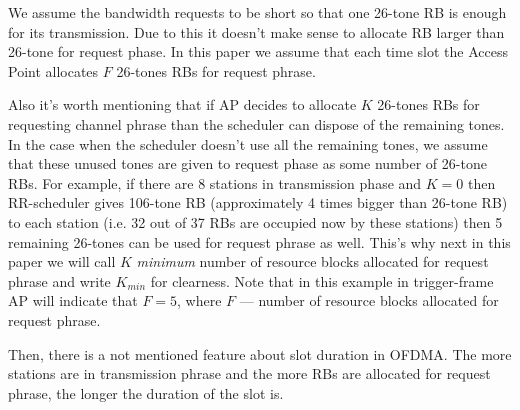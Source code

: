 We assume the bandwidth requests to be short so that one 26-tone RB is enough for its transmission. Due to this it doesn't make sense to allocate RB larger than 26-tone for request phase. In this paper we assume that each time slot the Access Point allocates $F$ 26-tones RBs for request phrase.

Also it's worth mentioning that if AP decides to allocate $K$ 26-tones RBs for requesting channel phrase than the scheduler can dispose of the remaining tones. In the case when the scheduler doesn't use all the remaining tones, we assume that these unused tones are given to request phase as some number of 26-tone RBs. For example, if there are 8 stations in transmission phase and $K=0$ then RR-scheduler gives 106-tone RB (approximately 4 times bigger than 26-tone RB) to each station (i.e. 32 out of 37 RBs are occupied now by these stations) then 5 remaining 26-tones can be used for request phrase as well. This's why next in this paper we will call $K$ \textit{minimum} number of resource blocks allocated for request phrase and write $K_{min}$ for clearness. Note that in this example in trigger-frame AP will indicate that $F = 5$, where $F$ --- number of resource blocks allocated for request phrase. 

Then, there is a not mentioned feature about slot duration in OFDMA. The more stations are in transmission phrase and the more RBs are allocated for request phrase, the longer the duration of the slot is.




